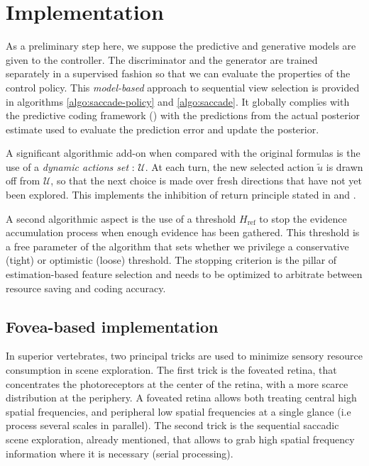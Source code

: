 \documentclass{article} %
\begin{document}
\section{Implementation}

As a preliminary step here, we suppose the predictive and generative models are given to the controller. The discriminator and the generator are trained separately in a supervised fashion so that we can evaluate the properties of the control policy.  This \emph{model-based} approach to sequential view selection is provided in algorithms \ref{algo:saccade-policy} and \ref{algo:saccade}. It globally complies with the predictive coding framework (\cite{rao1999predictive}) with the predictions from the actual posterior estimate used to evaluate the prediction error and update the posterior.


A significant algorithmic add-on when compared with the original formulas is the use of a \emph{dynamic actions set} : $\mathcal{U}$. At each turn, the new selected action $\tilde{u}$ is drawn off from $\mathcal{U}$, so that the next choice is made over fresh directions that have not yet been explored. This implements the inhibition of return principle stated in \cite{itti2001computational} and \cite{friston2012perceptions}.

A second algorithmic aspect is the use of a threshold $H_\text{ref}$ to stop the evidence accumulation process when enough evidence has been gathered. This threshold is a free parameter of the algorithm that sets whether we privilege a conservative (tight) or optimistic (loose) threshold. The stopping criterion is the pillar of estimation-based feature selection and needs to be optimized to arbitrate between resource saving and coding accuracy. 


\subsection{Fovea-based implementation}


In superior vertebrates, two principal tricks are used to minimize sensory resource consumption in scene exploration. The first trick is the foveated retina, that concentrates the photoreceptors at the center of the retina, with a more scarce distribution at the periphery. A foveated retina allows both treating central high spatial frequencies, and peripheral low spatial frequencies at a single glance (i.e process several scales in parallel). The second trick is the sequential saccadic scene exploration, already mentioned, that allows to grab high spatial frequency information where it is necessary (serial processing). 
\end{document}
